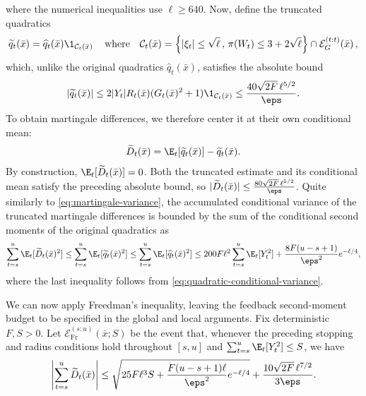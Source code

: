 where the numerical inequalities use $\ell\geq640$.
Now, define the truncated quadratics
\begin{align}
    \widetilde q_t(\bar{x})
    =\widehat q_t(\bar{x})\1_{\mathcal C_t(\bar{x})}\,
    \quad\text{where}\quad
    \mathcal C_t(\bar{x})
    =\left\{|\xi_t|\leq\sqrt\ell\,,\,
    \pi(W_t)\leq3+2\sqrt\ell\right\}
    \cap\mathcal E_G^{(t:t)}(\bar{x})\,,
    \label{eq:quadratic-cutoff-event}
\end{align}
which, unlike the original quadratics $\widehat q_t(\bar{x})$, satisfies the absolute bound
\begin{align}
    |\widetilde q_t(\bar{x})|
    \leq2|Y_t|R_t(\bar{x})(G_t(\bar{x})^2+1)
    \1_{\mathcal C_t(\bar{x})}
    \leq\frac{40\sqrt{2F}\,\ell^{5/2}}{\eps}.
    \label{eq:truncated-quadratic-bound}
\end{align}
To obtain martingale differences, we therefore center it at their own conditional mean:
\begin{align}
    \widetilde D_t(\bar{x})
    =\E_t[\widetilde q_t(\bar{x})]-\widetilde q_t(\bar{x}).
    \label{eq:truncated-martingale-difference}
\end{align}
By construction, $\E_t[\widetilde D_t(\bar{x})]=0$. Both the truncated
estimate and its conditional mean satisfy the preceding absolute bound,
so $|\widetilde D_t(\bar{x})| \leq\frac{80\sqrt{2F}\,\ell^{5/2}}{\eps}$.
Quite similarly to \eqref{eq:martingale-variance}, the accumulated conditional variance of the truncated martingale differences is bounded by the sum of the conditional second moments of the original quadratics as
\begin{align}
    \sum_{t=s}^{u}\E_t[\widetilde D_t(\bar{x})^2]
    \leq\sum_{t=s}^{u}\E_t[\widetilde q_t(\bar{x})^2]
    \leq\sum_{t=s}^{u}\E_t[\widehat q_t(\bar{x})^2]
    \leq200F\ell^2\sum_{t=s}^{u}\E_t[Y_t^2]
    +\frac{8F(u-s+1)}{\eps^2}e^{-\ell/4},
    \label{eq:truncated-variance-comparison}
\end{align}
where the last inequality follows from \eqref{eq:quadratic-conditional-variance}.

We can now apply Freedman's inequality, leaving the feedback second-moment
budget to be specified in the global and local arguments. Fix deterministic
$F,S>0$. Let $\mathcal E_{\mathrm{Fr}}^{(s:u)}(\bar{x};S)$ be the event that,
whenever the preceding stopping and radius conditions hold throughout
$[s,u]$ and $\sum_{t=s}^{u}\E_t[Y_t^2]\leq S$, we have
\begin{align}
    \left|\sum_{t=s}^{u}\widetilde D_t(\bar{x})\right|
    \leq\sqrt{25F\ell^3S+\frac{F(u-s+1)\ell}{\eps^2}e^{-\ell/4}}
    +\frac{10\sqrt{2F}\,\ell^{7/2}}{3\eps}.
    \label{eq:freedman-quadratic-bound}
\end{align}

